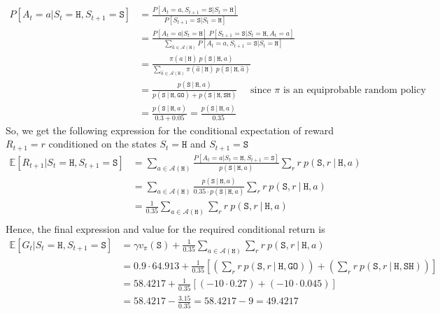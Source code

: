 \documentclass[11pt]{article}
\begin{document}
    \begin{align*}
        P[A_{t} = a | S_{t} = \texttt{H}, S_{t+1} = \texttt{S}] &= \frac{P[A_{t} = a, S_{t+1} = \texttt{S} | S_{t} = \texttt{H}]}{P[S_{t+1} = \texttt{S} | S_{t} = \texttt{H}]} \\
        &= \frac{P[A_{t} = a | S_{t} = \texttt{H}] \ P[S_{t+1} = \texttt{S} | S_{t} = \texttt{H}, A_{t} = a]}{\sum_{\hat{a} \in \mathcal{A}(\texttt{H})} P[A_{t} = a, S_{t+1} = \texttt{S} | S_{t} = \texttt{H}]} \\
        &= \frac{\pi(a \ | \ \texttt{H}) \ p(\texttt{S} \ | \ \texttt{H}, a)}{\sum_{\hat{a} \in \mathcal{A}(\texttt{H})} \pi(\hat{a} \ | \ \texttt{H}) \ p(\texttt{S} \ | \ \texttt{H}, \hat{a})} \\
        &= \frac{p(\texttt{S} \ | \ \texttt{H}, a)}{p(\texttt{S} \ | \ \texttt{H}, \texttt{GO}) + p(\texttt{S} \ | \ \texttt{H}, \texttt{SH})} \quad \text{ since $\pi$ is an equiprobable random policy} \\
        &= \frac{p(\texttt{S} \ | \ \texttt{H}, a)}{0.3 + 0.05} = \frac{p(\texttt{S} \ | \ \texttt{H}, a)}{0.35}
    \end{align*}
    So, we get the following expression for the conditional expectation of reward $R_{t+1} = r$ conditioned on the states $S_{t} = \texttt{H}$ and $S_{t+1} = \texttt{S}$
    \begin{align*}
        \mathbb{E}[R_{t+1} | S_{t} = \texttt{H}, S_{t+1} = \texttt{S}] &= \sum_{a \in \mathcal{A}(\texttt{H})} \frac{P[A_{t} = a | S_{t} = \texttt{H}, S_{t+1} = \texttt{S}]}{p(\texttt{S} \ | \ \texttt{H}, a)} \sum_{r} r \ p(\texttt{S}, r \ | \ \texttt{H}, a) \\
        &= \sum_{a \in \mathcal{A}(\texttt{H})} \frac{p(\texttt{S} \ | \ \texttt{H}, a)}{0.35 \cdot p(\texttt{S} \ | \ \texttt{H}, a)} \sum_{r} r \ p(\texttt{S}, r \ | \ \texttt{H}, a) \\
        &= \frac{1}{0.35} \sum_{a \in \mathcal{A}(\texttt{H})} \sum_{r} r \ p(\texttt{S}, r \ | \ \texttt{H}, a) \\
    \end{align*}
    Hence, the final expression and value for the required conditional return is
    \begin{align*}
        \mathbb{E}[G_{t} | S_{t} = \texttt{H}, S_{t+1} = \texttt{S}] &= \gamma v_{\pi}(\texttt{S}) + \frac{1}{0.35} \sum_{a \in \mathcal{A}(\texttt{H})} \sum_{r} r \ p(\texttt{S}, r \ | \ \texttt{H}, a) \\
        &= 0.9 \cdot 64.913 + \frac{1}{0.35} \left[ \left(\sum_{r} r \ p(\texttt{S}, r \ | \ \texttt{H}, \texttt{GO}) \right) + \left(\sum_{r} r \ p(\texttt{S}, r \ | \ \texttt{H}, \texttt{SH}) \right)\right] \\
        &= 58.4217 + \frac{1}{0.35} \left[ (-10 \cdot 0.27) + (-10 \cdot 0.045) \right] \\
        &= 58.4217 - \frac{3.15}{0.35} = 58.4217 - 9 = 49.4217
    \end{align*}
\end{document}
